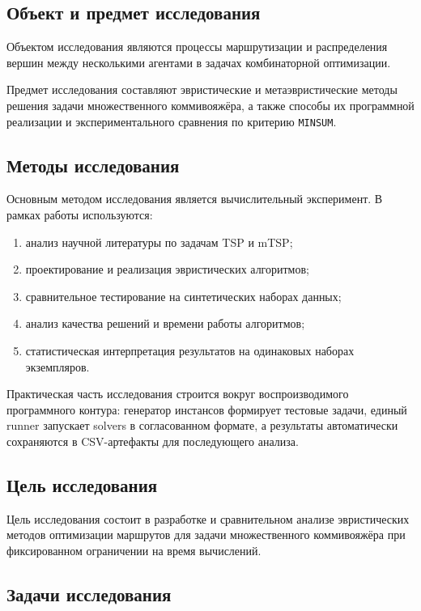 \documentclass[a4paper,12pt]{article}
\begin{document}
\subsection{Объект и предмет исследования}

Объектом исследования являются процессы маршрутизации и распределения вершин между несколькими агентами в задачах комбинаторной оптимизации.

Предмет исследования составляют эвристические и метаэвристические методы решения задачи множественного коммивояжёра, а также способы их программной реализации и экспериментального сравнения по критерию \texttt{MINSUM}.

\subsection{Методы исследования}

Основным методом исследования является вычислительный эксперимент. В рамках работы используются:
\begin{enumerate}[label=\arabic*.]
  \item анализ научной литературы по задачам TSP и mTSP;
  \item проектирование и реализация эвристических алгоритмов;
  \item сравнительное тестирование на синтетических наборах данных;
  \item анализ качества решений и времени работы алгоритмов;
  \item статистическая интерпретация результатов на одинаковых наборах экземпляров.
\end{enumerate}

Практическая часть исследования строится вокруг воспроизводимого программного контура: генератор инстансов формирует тестовые задачи, единый runner запускает solvers в согласованном формате, а результаты автоматически сохраняются в CSV-артефакты для последующего анализа.

\subsection{Цель исследования}

Цель исследования состоит в разработке и сравнительном анализе эвристических методов оптимизации маршрутов для задачи множественного коммивояжёра при фиксированном ограничении на время вычислений.

\subsection{Задачи исследования}
\end{document}
